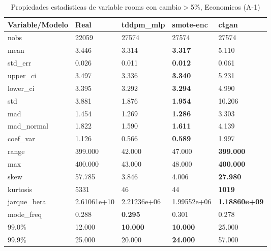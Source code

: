 \begin{table}[H]
\centering
\fontsize{8}{14}\selectfont
\caption{Propiedades estadisticas de variable rooms con cambio\ensuremath{>}5\%, Economicos (A-1)}
\label{table-stats-economicos-a-1-rooms-short}
\begin{tabular}{|l|m{10em}|m{10em}|m{10em}|m{10em}|}
\hline
 \rowcolor[gray]{0.8}
Variable/Modelo & Real & tddpm\_mlp & smote-enc & ctgan \\
\hline nobs & 22059 & 27574 & 27574 & 27574 \\
\hline mean & 3.446 & 3.314 & \bfseries 3.317 & \cellcolor[rgb]{0.9, 0.54, 0.52} 5.110 \\
\hline std\_err & 0.026 & 0.011 & \bfseries 0.012 & \cellcolor[rgb]{0.9, 0.54, 0.52} 0.061 \\
\hline upper\_ci & 3.497 & 3.336 & \bfseries 3.340 & \cellcolor[rgb]{0.9, 0.54, 0.52} 5.231 \\
\hline lower\_ci & 3.395 & 3.292 & \bfseries 3.294 & \cellcolor[rgb]{0.9, 0.54, 0.52} 4.990 \\
\hline std & 3.881 & 1.876 & \bfseries 1.954 & \cellcolor[rgb]{0.9, 0.54, 0.52} 10.206 \\
\hline mad & 1.454 & 1.269 & \bfseries 1.286 & \cellcolor[rgb]{0.9, 0.54, 0.52} 3.303 \\
\hline mad\_normal & 1.822 & 1.590 & \bfseries 1.611 & \cellcolor[rgb]{0.9, 0.54, 0.52} 4.139 \\
\hline coef\_var & 1.126 & 0.566 & \bfseries 0.589 & \cellcolor[rgb]{0.9, 0.54, 0.52} 1.997 \\
\hline range & 399.000 & \cellcolor[rgb]{0.9, 0.54, 0.52} 42.000 & 47.000 & \bfseries 399.000 \\
\hline max & 400.000 & \cellcolor[rgb]{0.9, 0.54, 0.52} 43.000 & 48.000 & \bfseries 400.000 \\
\hline skew & 57.785 & \cellcolor[rgb]{0.9, 0.54, 0.52} 3.846 & 4.006 & \bfseries 27.980 \\
\hline kurtosis & 5331 & 46 & \cellcolor[rgb]{0.9, 0.54, 0.52} 44 & \bfseries 1019 \\
\hline jarque\_bera & 2.61061e+10 & 2.21236e+06 & \cellcolor[rgb]{0.9, 0.54, 0.52} 1.99552e+06 & \bfseries 1.18860e+09 \\
\hline mode\_freq & 0.288 & \bfseries 0.295 & \cellcolor[rgb]{0.9, 0.54, 0.52} 0.301 & 0.278 \\
\hline 99.0\% & 12.000 & \bfseries 10.000 & \bfseries 10.000 & \cellcolor[rgb]{0.9, 0.54, 0.52} 25.000 \\
\hline 99.9\% & 25.000 & 20.000 & \bfseries 24.000 & \cellcolor[rgb]{0.9, 0.54, 0.52} 57.000 \\
\hline
\end{tabular}
\end{table}
